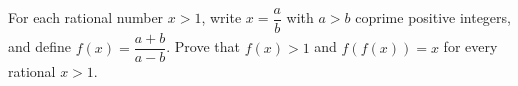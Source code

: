 For each rational number $x>1$, write $x=\dfrac ab$ with $a>b$ coprime positive integers, and define $f(x)=\dfrac{a+b}{a-b}$. Prove that $f(x)>1$ and $f(f(x))=x$ for every rational $x>1$.
